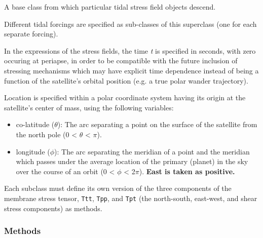 A base class from which particular tidal stress field objects descend.

Different tidal forcings are specified as sub-classes of this superclass 
(one for each separate forcing).

In the expressions of the stress fields, the time \textit{t} is specified 
in seconds, with zero occuring at periapse, in order to be compatible with 
the future inclusion of stressing mechanisms which may have explicit time 
dependence instead of being a function of the satellite's orbital position 
(e.g. a true polar wander trajectory).

Location is specified within a polar coordinate system having its origin at
the satellite's center of mass, using the following variables:

\begin{itemize}
\setlength{\parskip}{0.6ex}
  \item co-latitude (\(\theta\)): The arc separating a point on the surface of 
    the satellite from the north pole (0 {\textless} \(\theta\) {\textless}
    \(\pi\)).

  \item longitude (\(\phi\)): The arc separating the meridian of a point and 
    the meridian which passes under the average location of the primary 
    (planet) in the sky over the course of an orbit (0 {\textless} \(\phi\)
    {\textless} 2\(\pi\)). \textbf{East is taken as positive.}

\end{itemize}

Each subclass must define its own version of the three components of the 
membrane stress tensor, \texttt{Ttt}, \texttt{Tpp}, and \texttt{Tpt} (the 
north-south, east-west, and shear stress components) as methods.



  \subsubsection{Methods}

    \label{SatStress:SatStress:StressDef:calcLove}

